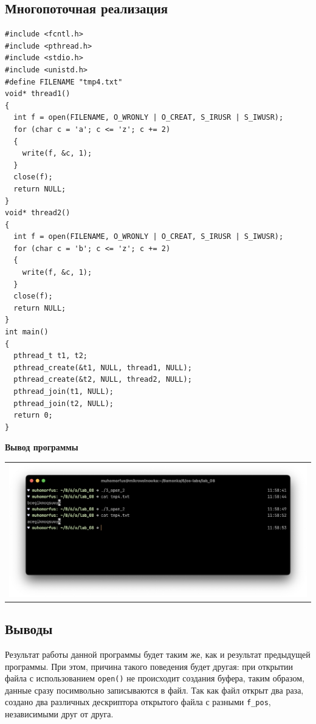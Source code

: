 \subsection{Многопоточная реализация}

\begin{lstlisting}
#include <fcntl.h>
#include <pthread.h>
#include <stdio.h>
#include <unistd.h>
#define FILENAME "tmp4.txt"
void* thread1()
{
  int f = open(FILENAME, O_WRONLY | O_CREAT, S_IRUSR | S_IWUSR);
  for (char c = 'a'; c <= 'z'; c += 2)
  {
    write(f, &c, 1);
  }
  close(f);
  return NULL;
}
void* thread2() 
{
  int f = open(FILENAME, O_WRONLY | O_CREAT, S_IRUSR | S_IWUSR);
  for (char c = 'b'; c <= 'z'; c += 2)
  { 
    write(f, &c, 1);
  }
  close(f);
  return NULL;
}
int main()
{
  pthread_t t1, t2;
  pthread_create(&t1, NULL, thread1, NULL);
  pthread_create(&t2, NULL, thread2, NULL);
  pthread_join(t1, NULL);
  pthread_join(t2, NULL);
  return 0;
}
\end{lstlisting}

\textbf{Вывод программы}

 \begin{table}[H]
	\centering
	\begin{tabular}{p{1\linewidth}}
		\centering
		\includegraphics[width=0.9\linewidth]{./images/8.png}
	\end{tabular}
\end{table}

\subsection{Выводы}

Результат работы данной программы будет таким же, как и результат предыдущей программы. При этом, причина такого поведения будет другая: при открытии файла с использованием \texttt{open()} не происходит создания буфера, таким образом, данные сразу посимвольно записываются в файл. Так как файл открыт два раза, создано два различных дескриптора открытого файла с разными \texttt{f\_pos}, независимыми друг от друга.

